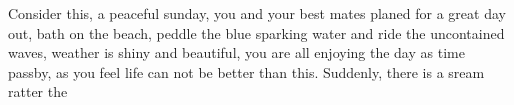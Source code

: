 Consider this, a peaceful sunday, you and your best mates planed for a great day out, bath on the beach, peddle the blue sparking water and ride the uncontained waves, weather is shiny and beautiful, you are all enjoying the day as time passby, as you feel life can not be better than this. Suddenly, there is a sream ratter the 